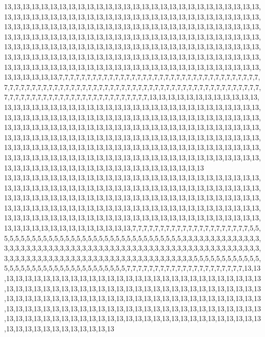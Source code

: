 13,13,13,13,13,13,13,13,13,13,13,13,13,13,13,13,13,13,13,13,13,13,13,13,13,13,13,13,13,13,13,13,13,13,13,13,13,13,13,13,13,13,13,13,13,13,13,13,13,13,13,13,13,13,13,13,13,13,13,13,13,13,13,13,13,13,13,13,13,13,13,13,13,13,13,13,13,13,13,13,13,13,13,13,13,13,13,13,13,13,13,13,13,13,13,13,13,13,13,13,13,13,13,13,13,13,13,13,13,13,13,13,13,13,13,13,13,13,13,13,13,13,13,13,13,13,13,13,13,13,13,13,13,13,13,13,13,13,13,13,13,13,13,13,13,13,13,13,13,13,13,13,13,13,13,13,13,13,13,13,13,13,13,13,13,13,13,13,13,13,13,13,13,13,13,13,13,13,13,13,13,13,13,13,13,13,13,13,13,13,13,13,13,13,13,13,13,13,13,13,13,13,7,7,7,7,7,7,7,7,7,7,7,7,7,7,7,7,7,7,7,7,7,7,7,7,7,7,7,7,7,7,7,7,7,7,7,7,7,7,7,7,7,7,7,7,7,7,7,7,7,7,7,7,7,7,7,7,7,7,7,7,7,7,7,7,7,7,7,7,7,7,7,7,7,7,7,7,7,7,7,7,7,7,7,7,7,7,7,7,7,7,7,7,7,7,7,7,7,7,7,7,7,7,7,7,7,7,7,7,13,13,13,13,13,13,13,13,13,13,13,13,13,13,13,13,13,13,13,13,13,13,13,13,13,13,13,13,13,13,13,13,13,13,13,13,13,13,13,13,13,13,13,13,13,13,13,13,13,13,13,13,13,13,13,13,13,13,13,13,13,13,13,13,13,13,13,13,13,13,13,13,13,13,13,13,13,13,13,13,13,13,13,13,13,13,13,13,13,13,13,13,13,13,13,13,13,13,13,13,13,13,13,13,13,13,13,13,13,13,13,13,13,13,13,13,13,13,13,13,13,13,13,13,13,13,13,13,13,13,13,13,13,13,13,13,13,13,13,13,13,13,13,13,13,13,13,13,13,13,13,13,13,13,13,13,13,13,13,13,13,13,13,13,13,13,13,13,13,13,13,13,13,13,13,13,13,13,13,13,13,13,13,13,13,13,13,13,13,13,13,13,13,13,13,13,13,13,13,13,13,13
13,13,13,13,13,13,13,13,13,13,13,13,13,13,13,13,13,13,13,13,13,13,13,13,13,13,13,13,13,13,13,13,13,13,13,13,13,13,13,13,13,13,13,13,13,13,13,13,13,13,13,13,13,13,13,13,13,13,13,13,13,13,13,13,13,13,13,13,13,13,13,13,13,13,13,13,13,13,13,13,13,13,13,13,13,13,13,13,13,13,13,13,13,13,13,13,13,13,13,13,13,13,13,13,13,13,13,13,13,13,13,13,13,13,13,13,13,13,13,13,13,13,13,13,13,13,13,13,13,13,13,13,13,13,13,13,13,13,13,13,13,13,13,13,13,13,13,13,13,13,13,13,13,13,7,7,7,7,7,7,7,7,7,7,7,7,7,7,7,7,7,7,7,7,7,5,5,5,5,5,5,5,5,5,5,5,5,5,5,5,5,5,5,5,5,5,5,5,5,5,5,5,5,5,5,5,5,5,5,3,3,3,3,3,3,3,3,3,3,3,3,3,3,3,3,3,3,3,3,3,3,3,3,3,3,3,3,3,3,3,3,3,3,3,3,3,3,3,3,3,3,3,3,3,3,3,3,3,3,3,3,3,3,3,3,3,3,3,3,3,3,3,3,3,3,3,3,3,3,3,3,3,3,3,3,3,3,3,3,3,3,3,3,3,3,3,3,3,3,3,3,3,3,5,5,5,5,5,5,5,5,5,5,5,5,5,5,5,5,5,5,5,5,5,5,5,5,5,5,5,5,5,5,5,5,5,5,7,7,7,7,7,7,7,7,7,7,7,7,7,7,7,7,7,7,7,7,7,13,13,13,13,13,13,13,13,13,13,13,13,13,13,13,13,13,13,13,13,13,13,13,13,13,13,13,13,13,13,13,13,13,13,13,13,13,13,13,13,13,13,13,13,13,13,13,13,13,13,13,13,13,13,13,13,13,13,13,13,13,13,13,13,13,13,13,13,13,13,13,13,13,13,13,13,13,13,13,13,13,13,13,13,13,13,13,13,13,13,13,13,13,13,13,13,13,13,13,13,13,13,13,13,13,13,13,13,13,13,13,13,13,13,13,13,13,13,13,13,13,13,13,13,13,13,13,13,13,13,13,13,13,13,13,13,13,13,13,13,13,13,13,13,13,13,13,13,13,13,13,13,13,13
